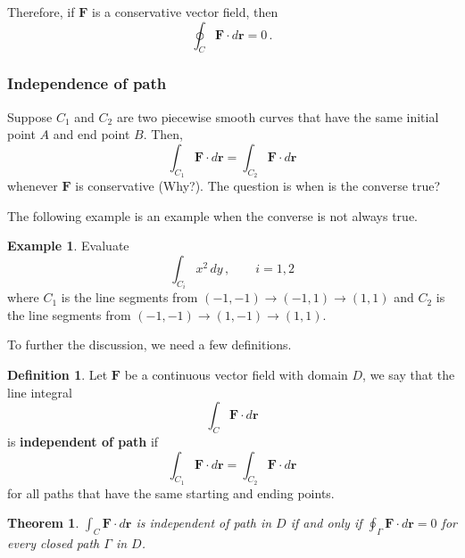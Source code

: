 \documentclass[
]{article}
\newtheorem{theorem}{Theorem}[section]
\theoremstyle{definition}
\newtheorem{definition}{Definition}[section]
\theoremstyle{definition}
\newtheorem{example}{Example}[section]
\theoremstyle{definition}
\theoremstyle{definition}
\theoremstyle{remark}
\begin{document}
Therefore, if \(\mathbf{F}\) is a conservative vector field, then
\begin{equation*}
    \oint_C \mathbf{F} \cdot d\mathbf{r} = 0 \,.
\end{equation*}

\subsubsection{Independence of path}\label{independence-of-path}

Suppose \(C_1\) and \(C_2\) are two piecewise smooth curves that have the same initial point \(A\)
and end point \(B\).
Then,
\begin{equation*}
    \int_{C_1} \mathbf{F}\cdot d\mathbf{r} 
    =
    \int_{C_2} \mathbf{F} \cdot d\mathbf{r} 
\end{equation*}
whenever \(\mathbf{F}\) is conservative (Why?).
The question is when is the converse true?

The following example is an example when the converse is not always true.

\begin{example}
Evaluate
\begin{equation*}
    \int_{C_i}  x^2 \, dy \,, \qquad i = 1,2
\end{equation*}
where \(C_1\) is the line segments from \((-1,-1) \to (-1,1) \to (1,1)\) and
\(C_2\) is the line segments from \((-1,-1) \to (1,-1) \to (1,1)\).
\end{example}

To further the discussion, we need a few definitions.

\begin{definition}
Let \(\mathbf{F}\) be a continuous vector field with domain \(D\), we say that the
line integral
\begin{equation*}
    \int_C \mathbf{F} \cdot d\mathbf{r} 
\end{equation*}
is \textbf{independent of path} if
\begin{equation*}
    \int_{C_1} \mathbf{F}\cdot d\mathbf{r} 
    =
    \int_{C_2} \mathbf{F} \cdot d\mathbf{r} 
\end{equation*}
for all paths that have the same starting and ending points.
\end{definition}

\begin{theorem}
\(\int_C \mathbf{F}\cdot d\mathbf{r}\) is independent of path in \(D\) if and only if
\(\oint_\Gamma \mathbf{F} \cdot d\mathbf{r} = 0\) for every closed path \(\Gamma\) in \(D\).
\end{theorem}
\end{document}
